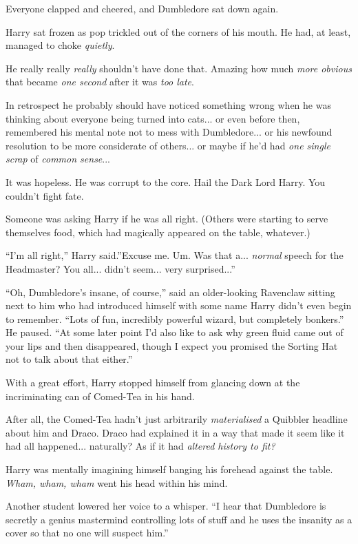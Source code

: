 Everyone clapped and cheered, and Dumbledore sat down again.

Harry sat frozen as pop trickled out of the corners of his mouth. He
had, at least, managed to choke \emph{quietly}.

He really really \emph{really} shouldn't have done that. Amazing how
much \emph{more obvious} that became \emph{one second} after it was
\emph{too late}.

In retrospect he probably should have noticed something wrong when he
was thinking about everyone being turned into cats... or even
before then, remembered his mental note not to mess with
Dumbledore... or his newfound resolution to be more considerate of
others... or maybe if he'd had \emph{one single scrap} of
\emph{common sense}...

It was hopeless. He was corrupt to the core. Hail the Dark Lord Harry.
You couldn't fight fate.

Someone was asking Harry if he was all right. (Others were starting to
serve themselves food, which had magically appeared on the table,
whatever.)

``I'm all right,'' Harry said.''Excuse me. Um. Was that a...
\emph{normal} speech for the Headmaster? You all... didn't
seem... very surprised...''

``Oh, Dumbledore's insane, of course,'' said an older-looking Ravenclaw
sitting next to him who had introduced himself with some name Harry
didn't even begin to remember. ``Lots of fun, incredibly powerful
wizard, but completely bonkers.'' He paused. ``At some later point I'd
also like to ask why green fluid came out of your lips and then
disappeared, though I expect you promised the Sorting Hat not to talk
about that either.''

With a great effort, Harry stopped himself from glancing down at the
incriminating can of Comed-Tea in his hand.

After all, the Comed-Tea hadn't just arbitrarily \emph{materialised} a
Quibbler headline about him and Draco. Draco had explained it in a way
that made it seem like it had all happened... naturally? As if it
had \emph{altered history to fit?}

Harry was mentally imagining himself banging his forehead against the
table. \emph{Wham, wham, wham} went his head within his mind.

Another student lowered her voice to a whisper. ``I hear that Dumbledore
is secretly a genius mastermind controlling lots of stuff and he uses
the insanity as a cover so that no one will suspect him.''

